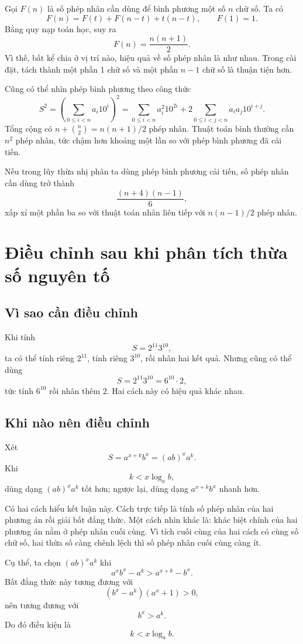\documentclass[11pt]{article}
\begin{document}
Gọi \(F(n)\) là số phép nhân cần dùng để bình phương một số \(n\) chữ số. Ta
có
\[
  F(n)=F(t)+F(n-t)+t(n-t),\qquad F(1)=1.
\]
Bằng quy nạp toán học, suy ra
\[
  F(n)=\frac{n(n+1)}{2}.
\]
Vì thế, bất kể chia ở vị trí nào, hiệu quả về số phép nhân là như nhau. Trong
cài đặt, tách thành một phần 1 chữ số và một phần \(n-1\) chữ số là thuận
tiện hơn.

Cũng có thể nhìn phép bình phương theo công thức
\[
  S^2=
  \left(\sum_{0\le i<n} a_i10^i\right)^2
  =
  \sum_{0\le i<n}a_i^2 10^{2i}
  +2\sum_{0\le i<j<n}a_i a_j 10^{i+j}.
\]
Tổng cộng có \(n+\binom{n}{2}=n(n+1)/2\) phép nhân. Thuật toán bình thường
cần \(n^2\) phép nhân, tức chậm hơn khoảng một lần so với phép bình phương
đã cải tiến.

Nếu trong lũy thừa nhị phân ta dùng phép bình phương cải tiến, số phép nhân
cần dùng trở thành
\[
  \frac{(n+4)(n-1)}{6},
\]
xấp xỉ một phần ba so với thuật toán nhân liên tiếp với \(n(n-1)/2\) phép
nhân.

\section{Điều chỉnh sau khi phân tích thừa số nguyên tố}

\subsection{Vì sao cần điều chỉnh}

Khi tính
\[
  S=2^{11}3^{10},
\]
ta có thể tính riêng \(2^{11}\), tính riêng \(3^{10}\), rồi nhân hai kết quả.
Nhưng cũng có thể dùng
\[
  S=2^{11}3^{10}=6^{10}\cdot 2,
\]
tức tính \(6^{10}\) rồi nhân thêm \(2\). Hai cách này có hiệu quả khác nhau.

\subsection{Khi nào nên điều chỉnh}

Xét
\[
  S=a^{x+k}b^x=(ab)^x a^k.
\]
Khi
\[
  k < x\log_a b,
\]
dùng dạng \((ab)^x a^k\) tốt hơn; ngược lại, dùng dạng \(a^{x+k}b^x\) nhanh
hơn.

Có hai cách hiểu kết luận này. Cách trực tiếp là tính số phép nhân của hai
phương án rồi giải bất đẳng thức. Một cách nhìn khác là: khác biệt chính của
hai phương án nằm ở phép nhân cuối cùng. Vì tích cuối cùng của hai cách có
cùng số chữ số, hai thừa số càng chênh lệch thì số phép nhân cuối cùng càng
ít.

Cụ thể, ta chọn \((ab)^x a^k\) khi
\[
  a^x b^x-a^k > a^{x+k}-b^x.
\]
Bất đẳng thức này tương đương với
\[
  (b^x-a^k)(a^x+1)>0,
\]
nên tương đương với
\[
  b^x>a^k.
\]
Do đó điều kiện là
\[
  k < x\log_a b.
\]
\end{document}
